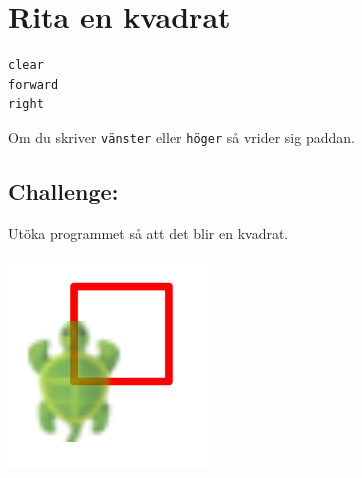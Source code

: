 \chapter{Rita en kvadrat}
\begin{multicols}{2}

\begin{lstlisting}[basicstyle={\ttfamily\fontsize{30}{36}\selectfont},numbers=none]
clear
forward
right
\end{lstlisting}
        
Om du skriver \lstinline{vänster} eller \lstinline{höger} så vrider sig paddan.
\section*{\color{BrickRed}Challenge:}
Utöka programmet så att det blir en kvadrat.

\columnbreak

\begin{center}
\includegraphics{../img/square.png}
\end{center}

\end{multicols}

